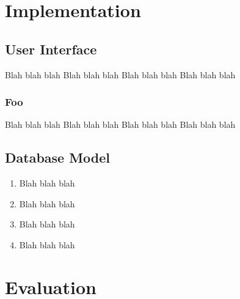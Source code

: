 \documentclass{l3proj}
\begin{document}

\chapter{Implementation}
\label{impl}




\section{User Interface}

Blah blah blah
Blah blah blah
Blah blah blah
Blah blah blah

\subsection{Foo}

Blah blah blah
Blah blah blah
Blah blah blah
Blah blah blah

\section{Database Model}

\begin{enumerate}
\item Blah blah blah
\item Blah blah blah
\item Blah blah blah
\item Blah blah blah
\end{enumerate}



\chapter{Evaluation}



\end{document}
